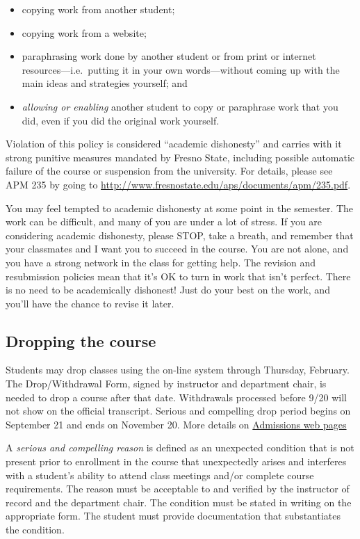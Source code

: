 \begin{itemize}
\tightlist
\item
  copying work from another student;
\item
  copying work from a website;
\item
  paraphrasing work done by another student or from print or internet
  resources---i.e.~putting it in your own words---without coming up with
  the main ideas and strategies yourself; and
\item
  \emph{allowing or enabling} another student to copy or paraphrase work
  that you did, even if you did the original work yourself.
\end{itemize}

Violation of this policy is considered ``academic dishonesty'' and
carries with it strong punitive measures mandated by Fresno State,
including possible automatic failure of the course or suspension from
the university. For details, please see APM 235 by going to
\url{http://www.fresnostate.edu/aps/documents/apm/235.pdf}.

You may feel tempted to academic dishonesty at some point in the
semester. The work can be difficult, and many of you are under a lot of
stress. If you are considering academic dishonesty, please STOP, take a
breath, and remember that your classmates and I want you to succeed in
the course. You are not alone, and you have a strong network in the
class for getting help. The revision and resubmission policies mean that
it's OK to turn in work that isn't perfect. There is no need to be
academically dishonest! Just do your best on the work, and you'll have
the chance to revise it later.

\hypertarget{dropping-the-course}{%
\subsection{Dropping the course}\label{dropping-the-course}}

Students may drop classes using the on-line system through Thursday,
February. The Drop/Withdrawal Form, signed by instructor and department
chair, is needed to drop a course after that date. Withdrawals processed
before 9/20 will not show on the official transcript. Serious and
compelling drop period begins on September 21 and ends on November 20.
More details on
\href{http://fresnostate.edu/studentaffairs/are/registration/add-drop-deadlines.html}{Admissions
web pages}

A \emph{serious and compelling reason} is defined as an unexpected
condition that is not present prior to enrollment in the course that
unexpectedly arises and interferes with a student's ability to attend
class meetings and/or complete course requirements. The reason must be
acceptable to and verified by the instructor of record and the
department chair. The condition must be stated in writing on the
appropriate form. The student must provide documentation that
substantiates the condition.

